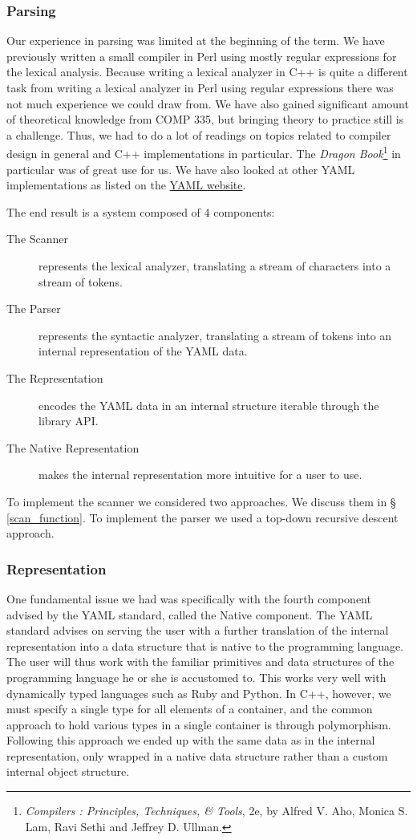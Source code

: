 \documentclass{article}
\begin{document}
\subsubsection{Parsing}
Our experience in parsing was limited at the beginning of the term.  We have
previously written a small compiler in Perl using mostly regular expressions for
the lexical analysis.  Because writing a lexical analyzer in C++ is quite
a different task from writing a lexical analyzer in Perl using regular
expressions there was not much experience we could draw from.  We have also
gained significant amount of theoretical knowledge from COMP 335, but bringing
theory to practice still is a challenge.  Thus, we had to do a lot of readings
on topics related to compiler design in general and C++ implementations in
particular.  The \emph{Dragon Book}\footnote{\emph{Compilers :  Principles,
Techniques, \& Tools}, 2e, by Alfred V. Aho, Monica S. Lam, Ravi Sethi and
Jeffrey D. Ullman.} in particular was of great use for us.  We have also looked
at other YAML implementations as listed on the \href{http://yaml.org/}{YAML
website}.

The end result is a system composed of 4 components:

\begin{description}
  \item[The Scanner] represents the lexical analyzer, translating a stream of 
    characters into a stream of tokens.
  \item[The Parser] represents the syntactic analyzer, translating a stream of 
    tokens into an internal representation of the YAML data.
  \item[The Representation] encodes the YAML data in an internal structure 
    iterable through the library API.
  \item[The Native Representation] makes the internal representation more
    intuitive for a user to use.
\end{description}

To implement the scanner we considered two approaches.  We discuss them in 
\S{} \ref{scan_function}.  To implement the parser we used a top-down recursive 
descent approach.

\subsubsection{Representation}
One fundamental issue we had was specifically with the fourth component advised 
by the YAML standard, called the Native component.  The YAML standard advises 
on serving the user with a further translation of the internal representation 
into a data structure that is native to the programming language.  The user 
will thus work with the familiar primitives and data structures of the 
programming language he or she is accustomed to.  This works very well with 
dynamically typed languages such as Ruby and Python.  In C++, however, we must
specify a single type for all elements of a container, and the common approach
to hold various types in a single container is through polymorphism.  Following
this approach we ended up with the same data as in the internal representation,
only wrapped in a native data structure rather than a custom internal object
structure.
\end{document}
